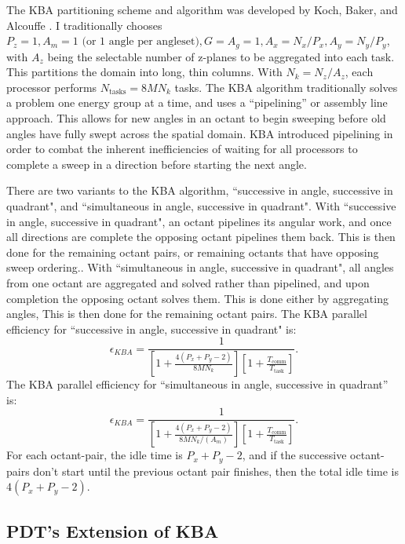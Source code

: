 \documentclass[times,final]{elsarticle}
\begin{document}
The KBA partitioning scheme and algorithm was developed by Koch, Baker, and Alcouffe \cite{KBA}.
I traditionally chooses $P_z = 1, A_m = 1 \text{ (or 1 angle per angleset)}, G = A_g = 1, A_x = N_x/P_x, A_y = N_y/P_y$, with $A_z$ being the selectable number of z-planes to be aggregated into each task.
This partitions the domain into long, thin columns.
With $N_k = N_z/A_z$, each processor performs $N_{\text{tasks}} = 8MN_k$ tasks.
The KBA algorithm traditionally solves a problem one energy group at a time, and uses a ``pipelining'' or assembly line approach.
This allows for new angles in an octant to begin sweeping before old angles have fully swept across the spatial domain.
KBA introduced pipelining in order to combat the inherent inefficiencies of waiting for all processors to complete a sweep in a direction before starting the next angle.

There are two variants to the KBA algorithm, ``successive in angle, successive in quadrant", and ``simultaneous in angle, successive in quadrant". 
With ``successive in angle, successive in quadrant", an octant pipelines its angular work, and once all directions are complete the opposing octant pipelines them back.
This is then done for the remaining octant pairs, or remaining octants that have opposing sweep ordering..
With ``simultaneous in angle, successive in quadrant", all angles from one octant are aggregated and solved rather than pipelined, and upon completion the opposing octant solves them.
This is done either by aggregating angles, This is then done for the remaining octant pairs. The KBA parallel efficiency \cite{mpadams2013} for ``successive in angle, successive in quadrant" is:
\begin{equation}
  \epsilon_{KBA} = \frac{1}{[1 + \frac{4(P_x+P_y-2)}{8MN_k}][1 + \frac{T_{\text{comm}}}{T_{\text{{task}}}}]}.
  \label{eps_kba}
\end{equation}
The KBA parallel efficiency for ``simultaneous in angle, successive in quadrant'' is:
\begin{equation}
   \epsilon_{KBA} = \frac{1}{[1 + \frac{4(P_x+P_y-2)}{8MN_k/(A_m)}][1 + \frac{T_{\text{comm}}}{T_{\text{{task}}}}]}.
   \label{eps_kba_simul}
\end{equation}
For each octant-pair, the idle time is $P_x + P_y - 2$, and if the successive octant-pairs don't start until the previous octant pair finishes, then the total idle time is $4(P_x + P_y - 2)$.

\subsection{PDT's Extension of KBA}\label {pdt_extension}
\end{document}
